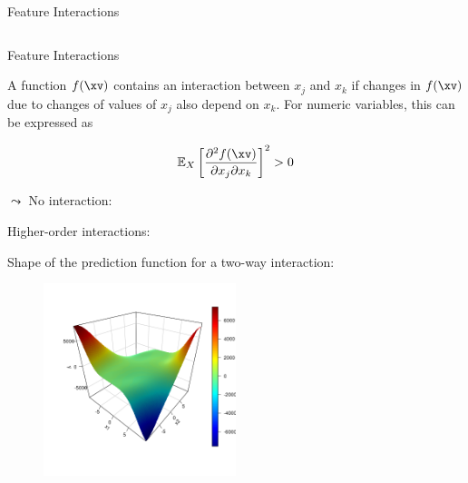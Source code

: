 \documentclass[11pt,compress,t,notes=noshow, aspectratio=169, xcolor=table]{beamer}
\begin{document}
\begin{frame}{Feature Interactions}
\begin{itemize}
\begin{columns}[T, totalwidth=\textwidth]
\begin{column}{0.5\textwidth}
\end{column}
\end{columns}
\end{itemize}
\end{frame}

\begin{frame}{Feature Interactions }

A function $f(\xv)$ contains an interaction between $x_j$ and $x_k$ if changes in $f(\xv)$ due to changes of values of $x_j$ also depend on $x_k$. For numeric variables, this can be expressed as

$$\mathbb{E}_X \left[ \frac{\partial^2 f(\xv)}{\partial x_j \partial x_k} \right]^2 > 0$$

$\leadsto$ No interaction: 

Higher-order interactions:

Shape of the prediction function for a two-way interaction:

\begin{figure}
\includegraphics[width = 0.5\textwidth]{figure/interaction}
\end{figure}
\end{frame}
\end{document}
